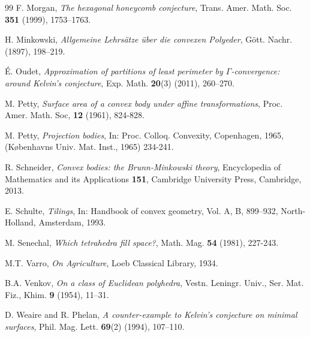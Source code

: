 \documentclass[twoside]{amsart}
\theoremstyle{definition}
\begin{document}
\begin{thebibliography}{99}
 F. Morgan, \emph{The hexagonal honeycomb conjecture}, Trans. Amer. Math. Soc. \textbf{351} (1999), 1753–1763.

 H. Minkowski, \emph{Allgemeine Lehrs\"atze \"uber die convexen Polyeder},  G\"ott. Nachr. (1897), 198–219.

 \'E. Oudet, \emph{Approximation of partitions of least perimeter by $\Gamma$-convergence: around Kelvin’s conjecture}, Exp. Math. \textbf{20}(3) (2011), 260–270.

 M. Petty, \emph{Surface area of a convex body under affine transformations}, Proc. Amer. Math. Soc, \textbf{12} (1961), 824-828.

 M. Petty, \emph{Projection bodies}, In: Proc. Colloq. Convexity, Copenhagen, 1965, (K\o benhavns Univ. Mat. Inst., 1965) 234-241.

 R. Schneider, \emph{Convex bodies: the Brunn-Minkowski theory}, Encyclopedia of Mathematics and its Applications \textbf{151}, Cambridge University Press, Cambridge, 2013.

 E. Schulte, \emph{Tilings}, In: Handbook of convex geometry, Vol. A, B, 899–932, North-Holland, Amsterdam, 1993. 

 M. Senechal, \emph{Which tetrahedra fill space?}, Math. Mag. \textbf{54} (1981), 227-243.



 M.T. Varro, \emph{On Agriculture}, Loeb Classical Library, 1934.

 B.A. Venkov, \emph{On a class of Euclidean polyhedra}, Vestn. Leningr. Univ., Ser. Mat. Fiz., Khim. \textbf{9} (1954), 11–31.

 D. Weaire and R. Phelan, \emph{A counter-example to Kelvin's conjecture on minimal surfaces}, Phil. Mag. Lett. \textbf{69}(2) (1994), 107–110.

\end{thebibliography}
\end{document}
